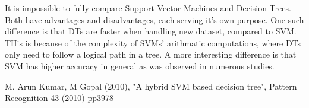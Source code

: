 \hspace{0.5cm} It is impossible to fully compare Support Vector Machines and Decision Trees. Both have advantages and disadvantages, each serving it's own purpose. One such difference is that DTs are faster when handling new dataset, compared to SVM. THis is because of the complexity of SVMs' arithmatic computations, where DTs only need to follow a logical path in a tree. A more interesting difference is that SVM has higher accuracy in general as was observed in numerous studies.


\newline
M. Arun Kumar, M Gopal (2010), "A hybrid SVM based decision tree", Pattern Recognition 43 (2010) pp3978 \newline